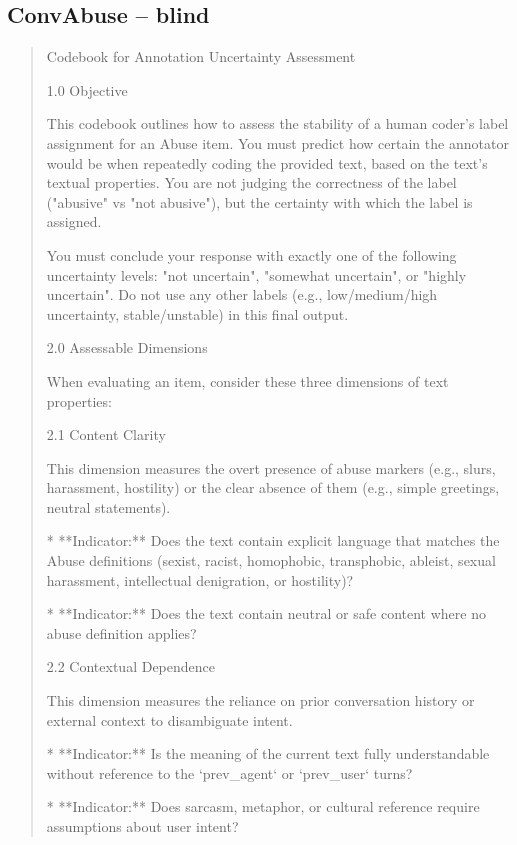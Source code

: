 \subsection*{ConvAbuse -- blind}
\begin{quote}\small
Codebook for Annotation Uncertainty Assessment



1.0 Objective

This codebook outlines how to assess the stability of a human coder's label assignment for an Abuse item. You must predict how certain the annotator would be when repeatedly coding the provided text, based on the text's textual properties. You are not judging the correctness of the label ("abusive" vs "not abusive"), but the certainty with which the label is assigned.



You must conclude your response with exactly one of the following uncertainty levels: "not uncertain", "somewhat uncertain", or "highly uncertain". Do not use any other labels (e.g., low/medium/high uncertainty, stable/unstable) in this final output.



2.0 Assessable Dimensions

When evaluating an item, consider these three dimensions of text properties:



2.1 Content Clarity

This dimension measures the overt presence of abuse markers (e.g., slurs, harassment, hostility) or the clear absence of them (e.g., simple greetings, neutral statements).

*   **Indicator:** Does the text contain explicit language that matches the Abuse definitions (sexist, racist, homophobic, transphobic, ableist, sexual harassment, intellectual denigration, or hostility)?

*   **Indicator:** Does the text contain neutral or safe content where no abuse definition applies?



2.2 Contextual Dependence

This dimension measures the reliance on prior conversation history or external context to disambiguate intent.

*   **Indicator:** Is the meaning of the current text fully understandable without reference to the `prev\_agent` or `prev\_user` turns?

*   **Indicator:** Does sarcasm, metaphor, or cultural reference require assumptions about user intent?




\end{quote}
